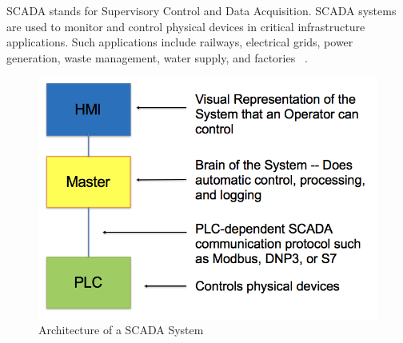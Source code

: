 \documentclass[oneside,11pt,a4paper,oldfontcommands]{book}
\begin{document}




\indent \indent SCADA stands for Supervisory Control and Data Acquisition. 
SCADA systems are used 
to monitor and control physical devices in critical infrastructure applications.
Such applications include railways, electrical grids, power generation,
waste management, water supply, and factories ~\cite{CyberWarfare}. \\

\begin{figure}[ht]
  \begin{center}
  \includegraphics{normal_scada}
  \caption{Architecture of a SCADA System}
  \label{fig:1}
  \end{center}
\end{figure}
\end{document}
